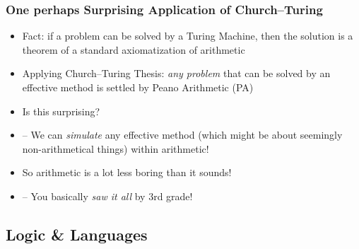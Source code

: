 \begin{frame}
\frametitle{One perhaps Surprising Application of Church--Turing}

\begin{itemize}[<+->]

\item Fact: if a problem can be solved by a Turing Machine, then the solution is a theorem of a standard axiomatization of arithmetic

\item Applying Church--Turing Thesis: \textit{any problem} that can be solved by an effective method is settled by Peano Arithmetic (PA)

\item Is this surprising?
\item[] -- We can \textit{simulate} any effective method (which might be about seemingly non-arithmetical things) within arithmetic! 

\item So arithmetic is a lot less boring than it sounds! 
\item[] -- You basically \textit{saw it all} by 3rd grade!



\end{itemize}
\end{frame}


\iffalse 

\subsection{Logic \& Languages}

